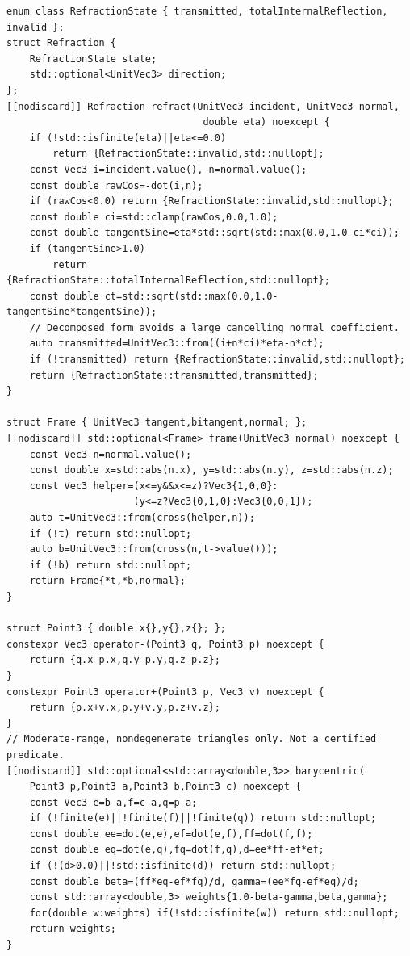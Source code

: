 \begin{verbatim}
enum class RefractionState { transmitted, totalInternalReflection, invalid };
struct Refraction {
    RefractionState state;
    std::optional<UnitVec3> direction;
};
[[nodiscard]] Refraction refract(UnitVec3 incident, UnitVec3 normal,
                                  double eta) noexcept {
    if (!std::isfinite(eta)||eta<=0.0)
        return {RefractionState::invalid,std::nullopt};
    const Vec3 i=incident.value(), n=normal.value();
    const double rawCos=-dot(i,n);
    if (rawCos<0.0) return {RefractionState::invalid,std::nullopt};
    const double ci=std::clamp(rawCos,0.0,1.0);
    const double tangentSine=eta*std::sqrt(std::max(0.0,1.0-ci*ci));
    if (tangentSine>1.0)
        return {RefractionState::totalInternalReflection,std::nullopt};
    const double ct=std::sqrt(std::max(0.0,1.0-tangentSine*tangentSine));
    // Decomposed form avoids a large cancelling normal coefficient.
    auto transmitted=UnitVec3::from((i+n*ci)*eta-n*ct);
    if (!transmitted) return {RefractionState::invalid,std::nullopt};
    return {RefractionState::transmitted,transmitted};
}

struct Frame { UnitVec3 tangent,bitangent,normal; };
[[nodiscard]] std::optional<Frame> frame(UnitVec3 normal) noexcept {
    const Vec3 n=normal.value();
    const double x=std::abs(n.x), y=std::abs(n.y), z=std::abs(n.z);
    const Vec3 helper=(x<=y&&x<=z)?Vec3{1,0,0}:
                      (y<=z?Vec3{0,1,0}:Vec3{0,0,1});
    auto t=UnitVec3::from(cross(helper,n));
    if (!t) return std::nullopt;
    auto b=UnitVec3::from(cross(n,t->value()));
    if (!b) return std::nullopt;
    return Frame{*t,*b,normal};
}

struct Point3 { double x{},y{},z{}; };
constexpr Vec3 operator-(Point3 q, Point3 p) noexcept {
    return {q.x-p.x,q.y-p.y,q.z-p.z};
}
constexpr Point3 operator+(Point3 p, Vec3 v) noexcept {
    return {p.x+v.x,p.y+v.y,p.z+v.z};
}
// Moderate-range, nondegenerate triangles only. Not a certified predicate.
[[nodiscard]] std::optional<std::array<double,3>> barycentric(
    Point3 p,Point3 a,Point3 b,Point3 c) noexcept {
    const Vec3 e=b-a,f=c-a,q=p-a;
    if (!finite(e)||!finite(f)||!finite(q)) return std::nullopt;
    const double ee=dot(e,e),ef=dot(e,f),ff=dot(f,f);
    const double eq=dot(e,q),fq=dot(f,q),d=ee*ff-ef*ef;
    if (!(d>0.0)||!std::isfinite(d)) return std::nullopt;
    const double beta=(ff*eq-ef*fq)/d, gamma=(ee*fq-ef*eq)/d;
    const std::array<double,3> weights{1.0-beta-gamma,beta,gamma};
    for(double w:weights) if(!std::isfinite(w)) return std::nullopt;
    return weights;
}


\end{verbatim}

